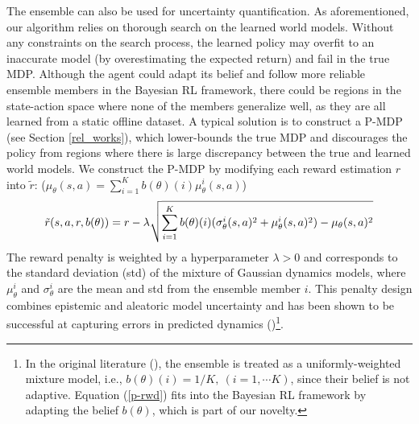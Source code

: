 
The ensemble can also be used for uncertainty quantification. As aforementioned, our algorithm relies on thorough search on the learned world models. Without any constraints on the search process, the learned policy may overfit to an inaccurate model (by overestimating the expected return) and fail in the true MDP.
Although the agent could adapt its belief and follow more reliable ensemble members in the Bayesian RL framework, there could be regions in the state-action space where none of the members generalize well, as they are all learned from a static offline dataset.
A typical solution is to construct a P-MDP (see Section \ref{rel_works}), which lower-bounds the true MDP and discourages the policy from regions where there is large discrepancy between the true and learned world models. 
We construct the P-MDP by modifying each reward estimation $r$ into $\tilde{r}$: ($\mu_\theta(s, a) = \sum_{i=1}^K b(\theta)(i) \mu_{\theta}^i(s, a)$)
\begin{equation} \label{p-rwd}
    \Tilde{r}(s, a, r, b(\theta)) = r - \lambda \sqrt{\sum_{i=1}^K b(\theta)(i) (\sigma_{\theta}^i(s, a)^2 + \mu_{\theta}^i(s, a)^2) - \mu_\theta(s, a)^2}
\end{equation}
The reward penalty is weighted by a hyperparameter $\lambda > 0$ and corresponds to the standard deviation (std) of the mixture of Gaussian dynamics models, where $\mu_{\theta}^i$ and $\sigma_{\theta}^i$ are the mean and std from the ensemble member $i$. 
This penalty design combines epistemic and aleatoric model uncertainty and has been shown to be successful at capturing errors in predicted dynamics (\cite{DBLP:conf/iclr/LuBPOR22})\footnote{In the original literature (\cite{DBLP:conf/nips/Lakshminarayanan17, DBLP:conf/iclr/LuBPOR22}), the ensemble is treated as a uniformly-weighted mixture model, i.e., $b(\theta)(i) = 1/K,\ (i=1, \cdots K)$, since their belief is not adaptive. Equation (\ref{p-rwd}) fits into the Bayesian RL framework by adapting the belief $b(\theta)$, which is part of our novelty.}.

